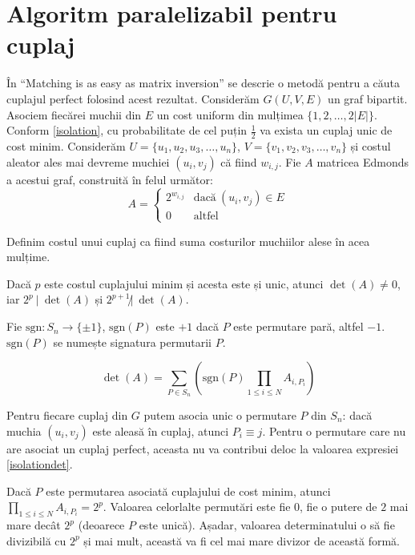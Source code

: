\pagebreak

\section{Algoritm paralelizabil pentru cuplaj}
\label{Algoritm paralelizabil pentru cuplaj}

În ``Matching is as easy as matrix inversion'' \cite{matchingezmatrix} se
descrie o metodă pentru a căuta cuplajul perfect folosind acest rezultat.
Considerăm $G(U, V, E)$ un graf bipartit. Asociem fiecărei muchii din $E$ un
cost uniform din mulțimea $\{1, 2, \ldots, 2|E|\}$. Conform \ref{isolation}, cu
probabilitate de cel puțin $\frac{1}{2}$ va exista un cuplaj unic de cost minim.
Considerăm $U = \{u_{1}, u_{2}, u_{3}, \ldots, u_{n}\}$,
$V = \{v_{1}, v_{2}, v_{3}, \ldots, v_{n}\}$ și costul aleator ales mai devreme muchiei
$(u_{i}, v_{j})$ că fiind $w_{i,j}$. Fie $A$ matricea Edmonds a acestui
graf, construită în felul următor:
\begin{equation}
A=
\begin{cases}
  2^{w_{i,j}} & \text{dacă}\ (u_{i}, v_{j}) \in E \\
  0 & \text{altfel}
\end{cases}
\end{equation}

Definim costul unui cuplaj ca fiind suma costurilor muchiilor alese în acea mulțime.
\begin{lem}
  Dacă $p$ este costul cuplajului minim și acesta este și unic, atunci $\det(A) \neq 0$, iar
  $2^{p} \ |\ \det(A)$ și $2^{p+1} \not| \ \det(A)$.
\end{lem}

Fie $\text{sgn} : S_{n} \to \{\pm 1\}$, $\text{sgn}(P)$ este $+1$ dacă $P$
este permutare pară, altfel $-1$. $\text{sgn}(P)$ se numește signatura
permutarii $P$.

\begin{equation}
  \label{isolationdet}
  \det(A) = \displaystyle\sum\limits_{P \in S_{n}} (\text{sgn}(P) \prod_{1 \leq i \leq N} A_{i, P_{i}})
\end{equation}

Pentru fiecare cuplaj din $G$ putem asocia unic o permutare $P$ din $S_{n}$:
dacă muchia $(u_{i}, v_{j})$ este aleasă în cuplaj, atunci $P_{i} \equiv j$.
Pentru o permutare care nu are asociat un cuplaj perfect, aceasta nu va
contribui deloc la valoarea expresiei \ref{isolationdet}. \par

Dacă $P$ este permutarea asociată cuplajului de cost minim, atunci
$\prod_{1 \leq i \leq N} A_{i, P_{i}} = 2^{p}$. Valoarea celorlalte permutări
este fie $0$, fie o putere de $2$ mai mare decât $2^{p}$ (deoarece $P$ este
unică). Așadar, valoarea determinatului o să fie divizibilă cu $2^{p}$ și
mai mult, această va fi cel mai mare divizor de această formă.

